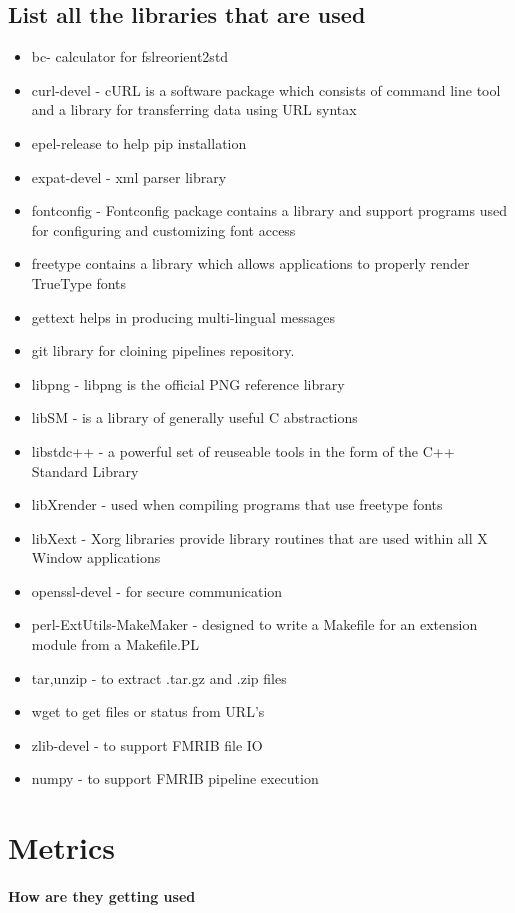 \subsection{List all the libraries that are used}
\begin{itemize}
 \item bc- calculator for fslreorient2std
 \item curl-devel - cURL is a software package which consists of command line tool and a library for transferring data using URL syntax
 \item epel-release to help pip installation
 \item expat-devel - xml parser library
 \item fontconfig - Fontconfig package contains a library and support programs used for configuring and customizing font access
 \item freetype contains a library which allows applications to properly render TrueType fonts
 \item gettext helps in producing multi-lingual messages
 \item git library for cloining pipelines repository.
 \item libpng - libpng is the official PNG reference library
 \item libSM - is a library of generally useful C abstractions
 \item libstdc++ - a powerful set of reuseable tools in the form of the C++ Standard Library
 \item libXrender - used when compiling programs that use freetype fonts
 \item libXext - Xorg libraries provide library routines that are used within all X Window applications
 \item openssl-devel - for secure communication
 \item perl-ExtUtils-MakeMaker - designed to write a Makefile for an extension module from a Makefile.PL
 \item tar,unzip - to extract .tar.gz and .zip files
 \item wget to get files or status from URL's
 \item zlib-devel - to support FMRIB file IO
 \item numpy - to support FMRIB pipeline execution
\end{itemize}

\section{Metrics}
\paragraph{How are they getting used}



